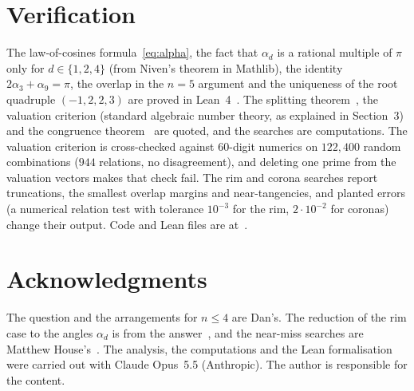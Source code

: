 \documentclass[11pt]{amsart}
\theoremstyle{remark}
\begin{document}
\section{Verification}

The law-of-cosines formula~\eqref{eq:alpha}, the fact that $\alpha_d$ is a rational multiple of $\pi$ only for $d\in\{1,2,4\}$ (from Niven's theorem in Mathlib), the identity $2\alpha_3+\alpha_9=\pi$, the overlap in the $n=5$ argument and the uniqueness of the root quadruple $(-1,2,2,3)$ are proved in Lean~4~\cite{mathlib}. The splitting theorem~\cite{CRS}, the valuation criterion (standard algebraic number theory, as explained in Section~3) and the congruence theorem~\cite{GLMWY} are quoted, and the searches are computations. The valuation criterion is cross-checked against $60$-digit numerics on $122{,}400$ random combinations ($944$ relations, no disagreement), and deleting one prime from the valuation vectors makes that check fail. The rim and corona searches report truncations, the smallest overlap margins and near-tangencies, and planted errors (a numerical relation test with tolerance $10^{-3}$ for the rim, $2\cdot10^{-2}$ for coronas) change their output. Code and Lean files are at~\cite{repo}.

\section*{Acknowledgments}

The question and the arrangements for $n\le4$ are Dan's. The reduction of the rim case to the angles $\alpha_d$ is from the answer~\cite{U}, and the near-miss searches are Matthew House's~\cite{House}. The analysis, the computations and the Lean formalisation were carried out with Claude Opus~5.5 (Anthropic). The author is responsible for the content.
\end{document}
